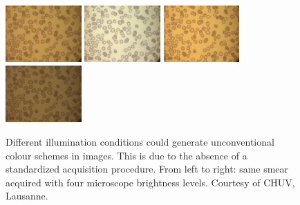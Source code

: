 \documentclass[final,a4paper,12pt,english]{UnicaPhdThesis3}
\begin{document}
\begin{figure}[!t]
	\centering	
	\includegraphics[width=2.9cm]{images/malaria/f1a}
	\includegraphics[width=2.9cm]{images/malaria/f1b}
	\includegraphics[width=2.9cm]{images/malaria/f1c}
	\includegraphics[width=2.9cm]{images/malaria/f1d}
	\caption{\label{f1_img_types} Different illumination conditions could generate unconventional colour schemes in images. This is due to the absence of a standardized acquisition procedure. From left to right: same smear acquired with four microscope brightness levels. Courtesy of CHUV, Lausanne.}
\end{figure}
\end{document}
